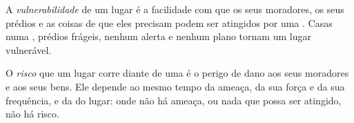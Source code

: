 \begin{definition}[Vulnerabilidade]\label{def:g9:natural-risks:vulnerability}
A \emph{vulnerabilidade} de um lugar é a
facilidade com que os seus moradores, os seus prédios e as coisas de que
eles precisam podem ser atingidos por uma . Casas numa
, prédios frágeis, nenhum alerta e nenhum plano
tornam um lugar vulnerável.
\end{definition}

\begin{definition}[Risco]\label{def:g9:natural-risks:risk}
O \emph{risco} que um lugar corre diante de uma  é o perigo de dano aos seus moradores e aos seus bens. Ele
depende ao mesmo tempo da ameaça, da sua força e da sua frequência, e da
 do lugar: onde não há ameaça, ou nada que possa ser
atingido, não há risco.
\end{definition}

